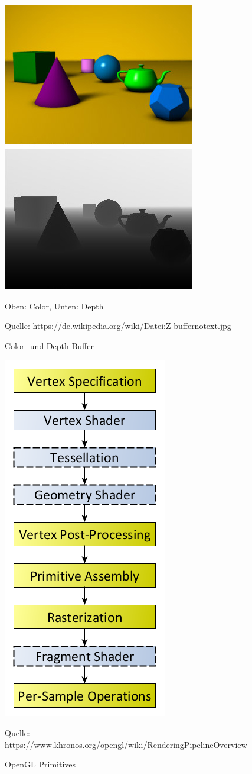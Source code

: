 \begin{figure}
	\centering
	\includegraphics[scale=0.5]{02theorie/DepthBuffer.jpg}
	
	
	Oben: Color, Unten: Depth
	
	Quelle: https://de.wikipedia.org/wiki/Datei:Z-buffer\textunderscore no\textunderscore text.jpg
	\caption{Color- und Depth-Buffer}\label{DepthBuffer}
\end{figure}


\begin{figure}
	\centering
	\includegraphics[scale=0.4]{02theorie/RenderingPipeline.png}
	
	
	Quelle: https://www.khronos.org/opengl/wiki/Rendering\textunderscore Pipeline\textunderscore Overview
	\caption{OpenGL Primitives}\label{RenderingPipeling}
\end{figure}

